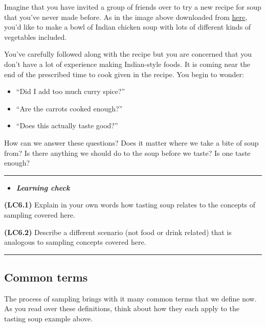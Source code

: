 \documentclass[]{tufte-book}
\providecommand{\tightlist}{%
  \setlength{\itemsep}{0pt}\setlength{\parskip}{0pt}}
\newenvironment{rmdblock}[1]
  {\begin{shaded*}
  \begin{itemize}
  \renewcommand{\labelitemi}{
    \raisebox{-.7\height}[0pt][0pt]{
    }
  }
  \item
  }
  {
  \end{itemize}
  \end{shaded*}
  }
\newenvironment{learncheck}
  {\begin{rmdblock}{warning}}
  {\end{rmdblock}}
\begin{document}
Imagine that you have invited a group of friends over to try a new
recipe for soup that you've never made before. As in the image above
downloaded from
\href{http://readthespirit.wpengine.netdna-cdn.com/feed-the-spirit/wp-content/uploads/sites/19/2015/02/Chicken-soup-Indian-by-Fifth-Floor-Kitchen.jpg}{here},
you'd like to make a bowl of Indian chicken soup with lots of different
kinds of vegetables included.

You've carefully followed along with the recipe but you are concerned
that you don't have a lot of experience making Indian-style foods. It is
coming near the end of the prescribed time to cook given in the recipe.
You begin to wonder:

\begin{itemize}
\tightlist
\item
  ``Did I add too much curry spice?''
\item
  ``Are the carrots cooked enough?''\\
\item
  ``Does this actually taste good?''
\end{itemize}

How can we answer these questions? Does it matter where we take a bite
of soup from? Is there anything we should do to the soup before we
taste? Is one taste enough?

\begin{center}\rule{\linewidth}{\linethickness}\end{center}\begin{learncheck}
\textbf{\emph{Learning check}}
\end{learncheck}

\textbf{(LC6.1)} Explain in your own words how tasting soup relates to
the concepts of sampling covered here.

\textbf{(LC6.2)} Describe a different scenario (not food or drink
related) that is analogous to sampling concepts covered here.

\begin{center}\rule{\linewidth}{\linethickness}\end{center}

\subsection{Common terms}\label{common-terms}

The process of sampling brings with it many common terms that we define
now. As you read over these definitions, think about how they each apply
to the tasting soup example above.
\end{document}
